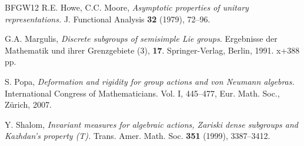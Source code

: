 \documentclass[11pt]{amsart}
\numberwithin{equation}{section}
\theoremstyle{plain}
\theoremstyle{definition}
\begin{document}
\begin{thebibliography}{BFGW12}
 {\sc R.E. Howe, C.C. Moore}, {\it Asymptotic properties of unitary representations.} J. Functional Analysis {\bf 32} (1979), 72--96.

 {\sc G.A. Margulis}, {\it Discrete subgroups of semisimple Lie groups.} Ergebnisse der Mathematik und ihrer Grenzgebiete (3), {\bf 17}. Springer-Verlag, Berlin, 1991. x+388 pp. 

 {\sc S. Popa}, {\it Deformation and rigidity for group actions and von Neumann algebras.} International Congress of Mathematicians. Vol. I, 445--477, Eur. Math. Soc., Z\"urich, 2007.

 {\sc Y. Shalom}, {\it Invariant measures for algebraic actions, Zariski dense subgroups and Kazhdan's property {\em (T)}.} Trans. Amer. Math. Soc. {\bf 351} (1999), 3387--3412.


\end{thebibliography}

\end{document}
